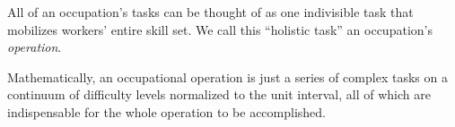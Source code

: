 \documentclass[hidelinks, nonatbib]{elsarticle}
\begin{document}
\begin{axiom}
    \label{woca}
    All of an occupation's tasks can be thought of as one indivisible task that mobilizes workers' entire skill set. We call this ``holistic task'' an occupation's \textit{operation}.

    Mathematically, an occupational operation is just a series of complex tasks on a continuum of difficulty levels normalized to the unit interval, all of which are indispensable for the whole operation to be accomplished.
    

\end{axiom}
\end{document}
